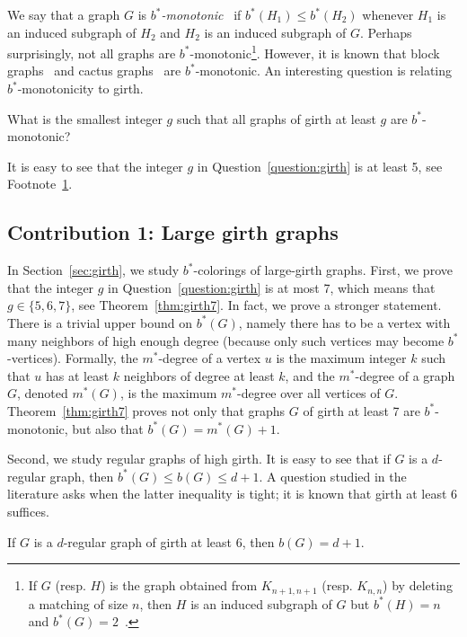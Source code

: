 \documentclass[runningheads, envcountsame]{llncs}
\begin{document}
We say that a graph $G$ is \emph{$b^*$-monotonic}~\cite{ZAKER2025370} if $b^*(H_1) \le b^*(H_2)$ whenever $H_1$ is an induced subgraph of $H_2$ and $H_2$ is an induced subgraph of $G$.
Perhaps surprisingly, not all graphs are $b^*$-monotonic\footnote{\label{fn:mono}If $G$ (resp. $H$) is the graph obtained from $K_{n+1, n+1}$ (resp. $K_{n, n}$) by deleting a matching of size $n$, then $H$ is an induced subgraph of $G$ but $b^*(H) = n$ and $b^*(G) = 2$~\cite{ZAKER2025370}.}.
However, it is known that block graphs~\cite[Proposition 6]{ZAKER2025370} and cactus graphs~\cite[Proposition 8]{ZAKER2025370} are $b^*$-monotonic.
An interesting question is relating $b^*$-monotonicity to girth.
%
\begin{question}\label{question:girth}
What is the smallest integer $g$ such that all graphs of girth at least $g$ are $b^*$-monotonic?
\end{question}
%
It is easy to see that the integer $g$ in Question~\ref{question:girth} is at least 5, see Footnote~\ref{fn:mono}.

\subsection*{Contribution 1: Large girth graphs}

In Section~\ref{sec:girth}, we study $b^*$-colorings of large-girth graphs. First, we prove that the integer $g$ in Question~\ref{question:girth} is at most 7, which means that $g \in \{5, 6, 7\}$, see Theorem~\ref{thm:girth7}. In fact, we prove a stronger statement.
There is a trivial upper bound on $b^*(G)$, namely there has to be a vertex with many neighbors of high enough degree (because only such vertices may become $b^*$-vertices).
Formally, the $m^*$-degree of a vertex $u$ is the maximum integer $k$ such that $u$ has at least $k$ neighbors of degree at least $k$, and the $m^*$-degree of a graph $G$, denoted $m^*(G)$, is the maximum $m^*$-degree over all vertices of $G$.
Theorem~\ref{thm:girth7} proves not only that graphs $G$ of girth at least 7 are $b^*$-monotonic, but also that $b^*(G) = m^*(G) + 1$.

Second, we study regular graphs of high girth. It is easy to see that if $G$ is a $d$-regular graph, then $b^*(G) \le b(G) \le d+1$.
A question studied in the literature asks when the latter inequality is tight; it is known that girth at least 6 suffices.

\begin{theorem}\label{thm:bg6}
If $G$ is a $d$-regular graph of girth at least 6, then $b(G) = d + 1$.
\end{theorem}
\end{document}
